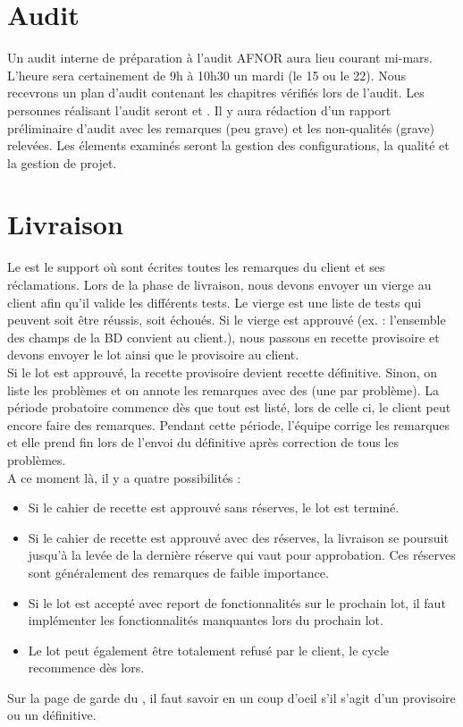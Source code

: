\documentclass [a4paper] {article}
\begin{document}
\section{Audit}
Un audit interne de préparation à l'audit AFNOR aura lieu courant mi-mars. L'heure sera certainement de 9h à 10h30 un mardi (le 15 ou le 22). Nous recevrons un plan d'audit contenant les chapitres vérifiés lors de l'audit. Les personnes réalisant l'audit seront \nomTuteurQualite{} et \nomApprobateur{}. Il y aura rédaction d'un rapport préliminaire d'audit avec les remarques (peu grave) et les non-qualités (grave) relevées. Les élements examinés seront la gestion des configurations, la qualité et la gestion de projet.


\section{Livraison}
Le \CDR{} est le support où sont écrites toutes les remarques du client et ses réclamations. Lors de la phase de livraison, nous devons envoyer un \CDR{} vierge au client afin qu'il valide les différents tests. Le \CDR{} vierge est une liste de tests qui peuvent soit être réussis, soit échoués. Si le \CDR{} vierge est approuvé (ex. : l'ensemble des champs de la BD convient au client.), nous passons en recette provisoire et devons envoyer le lot ainsi que le \CDR{} provisoire au client.\\
Si le lot est approuvé, la recette provisoire devient recette définitive. Sinon, on liste les problèmes et on annote les remarques avec des \FFT{} (une \FFTCourt{} par problème). La période probatoire commence dès que tout est listé, lors de celle ci, le client peut encore faire des remarques. Pendant cette période, l'équipe corrige les remarques et elle prend fin lors de l'envoi du \CDR{} définitive après correction de tous les problèmes.\\
A ce moment là, il y a quatre possibilités :
\begin{itemize}
\item Si le cahier de recette est approuvé sans réserves, le lot est terminé.
\item Si le cahier de recette est approuvé avec des réserves, la livraison se poursuit jusqu'à la levée de la dernière réserve qui vaut pour approbation. Ces réserves sont généralement des remarques de faible importance.
\item Si le lot est accepté avec report de fonctionnalités sur le prochain lot, il faut implémenter les fonctionnalités manquantes lors du prochain lot.
\item Le lot peut également être totalement refusé par le client, le cycle recommence dès lors.
\end{itemize}
Sur la page de garde du \CDR{}, il faut savoir en un coup d'oeil s'il s'agit d'un \CDR{} provisoire ou un \CDR{} définitive.
\end{document}
